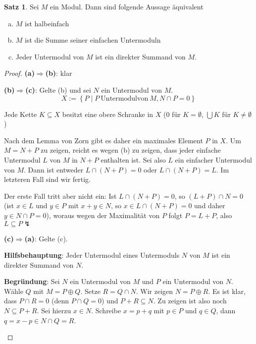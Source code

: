 \documentclass[
twoside=semi,
fontsize=12,
DIV=12, 
cleardoublepage=current,
leqno,
headings=optiontoheadandtoc, 
toc=idx
]{scrbook}
\newcommand{\set}[1]{\left\{ #1 \right\}}
\theoremstyle{definition}
\newtheorem{satz}[definition]{Satz}
\begin{document}
	\begin{satz}\label{1.3.10}\hfill\newline
		Sei $M$ ein Modul. Dann sind folgende Aussage \"aquivalent
		\begin{enumerate}[(a)]
			\item $M$ ist halbeinfach
			
			\item $M$ ist die Summe seiner einfachen Untermoduln
			
			\item Jeder Untermodul von $M$ ist ein direkter Summand von $M$.
		\end{enumerate}	
		
		\begin{proof}\hfill\newline
			\textbf{(a)$\Longrightarrow$(b)}: klar
			
			\medskip\noindent
			\textbf{(b)$\Longrightarrow$(c)}: Gelte (b) und sei $N$ ein Untermodul von $M$.
				\[X:= \set{P \mid P \ \mathrm{Untermodul von }\ M, N \cap P = 0}\]
			
			\noindent Jede Kette $K \subseteq X$ besitzt eine obere Schranke in $X$ ($0$ f\"ur $K = \emptyset$, $\bigcup K$ f\"ur $K \neq \emptyset$)
			
			\noindent Nach dem Lemma von Zorn gibt es daher ein maximales Element $P$ in $X$. Um $M = N + P$ zu zeigen, reicht es wegen (b) zu zeigen, dass jeder einfache Untermodul $L$ von $M$ in $N + P$ enthalten ist. Sei also $L$ ein einfacher Untermodul von $M$. Dann ist entweder $L \cap (N + P) = 0$ oder $L \cap (N + P) = L$. Im letzteren Fall sind wir fertig.
			
			\noindent Der erste Fall tritt aber nicht ein:\newline
			Ist $L \cap (N+P) = 0$, so $(L+P)\cap N = 0$ (ist $x \in L$ und $y \in P$ mit $x+y \in N$, so $x \in L\cap (N+P) = 0$ und daher $y \in N\cap P = 0$), woraus wegen der Maximalit\"at von $P$ folgt $P = L + P$, also $L \subseteq P \lightning$
			
			\medskip\noindent 
			\textbf{(c)$\Longrightarrow$(a)}: Gelte (c).\newline

			\begin{tcolorbox}[colback=white,colframe=blue,arc=0cm]
				\textbf{Hilfsbehauptung}: Jeder Untermodul eines Untermoduls $N$ von $M$ ist ein direkter Summand von $N$.
			
				\tcblower
				\textbf{Begr\"undung}: Sei $N$ ein Untermodul von $M$ und $P$ ein Untermodul von $N$.
				W\"ahle $Q$ mit $M = P \oplus Q$. Setze $R = Q \cap N$. Wir zeigen $N = P \oplus R$. Es ist klar, dass $P \cap R = 0$ (denn $P \cap Q = 0$) und $P + R \subseteq N$. Zu zeigen ist also noch $N \subseteq P + R$. \newline
				Sei hierzu $x \in N$. Schreibe $x = p + q$ mit $p \in P$ und $q \in Q$, dann \linebreak $q = x - p \in N \cap Q = R$. 
			\end{tcolorbox}
			

\end{proof}
\end{satz}
\end{document}

